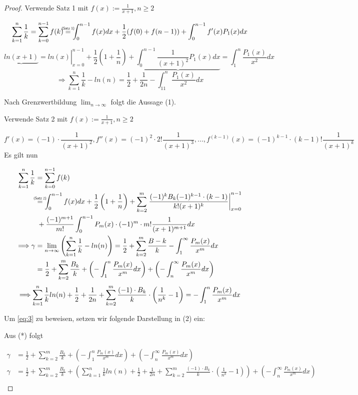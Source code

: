 \documentclass[12pt]{article}
\newcommand{\overtext}[2]{\mathrel{\overset{\makebox[0pt]{\mbox{\normalfont\tiny\sffamily #2}}}{#1}}}
\begin{document}
\begin{proof}

Verwende Satz 1 mit \(f(x) := \frac{1}{x + 1}, n \geq 2\)

\[\sum_{k=1}^n \frac{1}{k} = \sum_{k=0}^{n-1} f(k) \overtext{=}{(Satz 1)} \int_0^{n-1} f(x) dx + \frac{1}{2} (f(0) + f(n-1)) + \int_0^{n-1} f'(x) P_1(x) dx\]
\[\left. \underbrace{ln(x+1)}{=ln(x)} \right|_{x=0}^{n-1} + \frac{1}{2}\left(1 + \frac{1}{n}\right) + \underbrace{\int_0^{n-1} \frac{1}{(x+1)^2} P_1(x) dx}{=\int_1^n \frac{P_1(x)}{x^2} dx}\]
\[\Longrightarrow \sum_{k=1}^n \frac{1}{k} - ln(n) = \frac{1}{2} + \frac{1}{2n} - \int_11^n \frac{P_1(x)}{x^2} dx\]

Nach Grenzwertbildung \(\lim_{n \to \infty}\) folgt die Aussage (1).

Verwende Satz 2 mit \(f(x) := \frac{1}{x+1}, n \geq 2\)

\[f'(x) = (-1) \cdot \frac{1}{(x+1)^2}, f''(x) = (-1)^2 \cdot 2! \frac{1}{(x+1)^3}, ..., f^{(k-1)}(x) = (-1)^{k-1} \cdot (k-1)! \frac{1}{(x+1)^k}\]
Es gilt nun

\begin{align*}
\sum_{k=1}^n \frac{1}{k} &= \sum_{k=0}^{n-1} f(k) \\
&\overtext{=}{(Satz 2)} \int_0^{n-1} f(x) dx + \frac{1}{2} \left(1 + \frac{1}{n}\right) + \sum_{k=2}^m \left. \frac{(-1)^k B_k (-1)^{k-1}\cdot(k-1)}{k! (x+1)^k} \right|_{x=0}^{n-1} \\
&\; + \frac{(-1)^{m+1}}{m!} \int_0^{n-1} P_m(x) \cdot (-1)^m \cdot m! \frac{1}{(x+1)^{m+1}} dx \\
\Longrightarrow \gamma &= \lim_{n \to \infty} \left(\sum_{k=1}^n \frac{1}{k} - ln(n)\right) = \frac{1}{2} + \sum_{k=2}^m \frac{B-k}{k} - \int_1^{\infty} \frac{P_m(x)}{x^m} dx \\
&= \frac{1}{2} + \sum_{k=2}^m \frac{B_k}{k} + \left(-\int_1^n \frac{P_m(x)}{x^m} dx\right) + \left(-\int_n^{\infty} \frac{P_m(x)}{x^m} dx\right) \\
\end{align*}
\[\Longrightarrow \sum_{k=1}^n \frac{1}{k} ln(n) + \frac{1}{2} + \frac{1}{2n} + \sum_{k=2}^m \frac{(-1) \cdot B_k}{k} \cdot \left(\frac{1}{n^k} - 1\right) = -\int_1^n \frac{P_m(x)}{x^m} dx \\
\]

Um \eqref{eq:3} zu beweisen, setzen wir folgende Darstellung in (2) ein:

Aus (*) folgt

\begin{align*}
\gamma &= \frac{1}{2} + \sum_{k=2}^m \frac{B_k}{k} + \left(-\int_1^n \frac{P_m(x)}{x^m} dx\right) + \left(-\int_n^{\infty} \frac{P_m(x)}{x^m} dx\right) \\
\gamma &= \frac{1}{2} + \sum_{k=2}^m \frac{B_k}{k} + \left(\sum_{k=1}^n \frac{1}{k} ln(n) + \frac{1}{2} + \frac{1}{2n} + \sum_{k=2}^m \frac{(-1) \cdot B_k}{k} \cdot \left(\frac{1}{n^k} - 1\right)\right) + \left(-\int_n^{\infty} \frac{P_m(x)}{x^m} dx\right) \\
\end{align*}
\end{proof}
\end{document}
